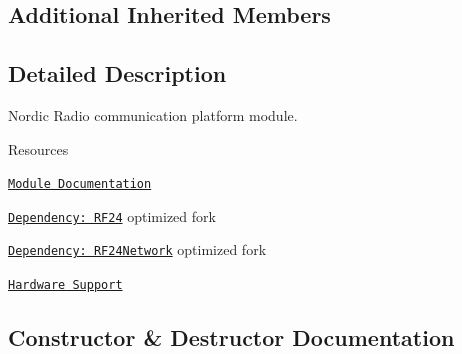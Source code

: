\subsection*{Additional Inherited Members}


\subsection{Detailed Description}
Nordic Radio communication platform module. 

\begin{DoxyParagraph}{Resources}

\begin{DoxyItemize}
\item \href{https://openslab-osu.github.io/Loom/html/class_loom__n_r_f.html}{\tt Module Documentation}
\item \href{https://github.com/nRF24/RF24}{\tt Dependency\+: R\+F24} optimized fork
\item \href{https://github.com/nRF24/RF24Network}{\tt Dependency\+: R\+F24\+Network} optimized fork
\item \href{https://github.com/OPEnSLab-OSU/Loom/wiki/Hardware-Support#nrf}{\tt Hardware Support} 
\end{DoxyItemize}
\end{DoxyParagraph}


\subsection{Constructor \& Destructor Documentation}
